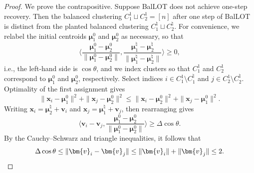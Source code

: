\documentclass{article}
\theoremstyle{plain}
\theoremstyle{definition}
\newcommand{\1}{\mathbf{1}}
\newcommand{\bmu}{\bm{\mu}}
\begin{document}
\begin{proof}
We prove the contrapositive.
Suppose BalLOT does not achieve one-step recovery. Then the balanced clustering $C_1^1\sqcup C_2^1 = [n]$ after one step of BalLOT is distinct from the planted balanced clustering $C_1^\natural \sqcup C_2^\natural$. For convenience, we relabel the initial centroids $\bmu_1^0$ and $\bmu_2^0$ as necessary, so that
\[
\bigg\langle
\frac{\bmu_1^0-\bmu_2^0}{\|\bmu_1^0-\bmu_2^0\|},
\frac{\bmu^{\natural}_1-\bmu^{\natural}_2}{\|\bmu^{\natural}_1-\bmu^{\natural}_2\|}
\bigg\rangle
\geq0,
\]
i.e., the left-hand side is $\cos\theta$, and we index clusters so that $C_1^1$ and $C_2^1$ correspond to $\bmu_1^0$ and $\bmu_2^0$, respectively. 
Select indices $i\in C_1^1\setminus C_1^\natural$ and $j\in C_2^1\setminus C_2^\natural$.
Optimality of the first assignment gives
\[
\|\bm{x}_i-\bmu_1^0\|^2+\|\bm{x}_j-\bmu_2^0\|^2
\leq
\|\bm{x}_i-\bmu_2^0\|^2+\|\bm{x}_j-\bmu_1^0\|^2.
\]
Writing $\bm{x}_i=\bmu^{\natural}_2+\bm{v}_i$ and $\bm{x}_j=\bmu^{\natural}_1+\bm{v}_j$, then rearranging gives
\[
\bigg\langle\bm{v}_i-\bm{v}_j,
\frac{\bmu_1^0-\bmu_2^0}{\|\bmu_1^0-\bmu_2^0\|}\bigg\rangle
\geq\Delta\cos\theta.
\]
By the Cauchy--Schwarz and triangle inequalities, it follows that
\[
\Delta\cos\theta
\leq\|\bm{v}_i-\bm{v}_j\|
\leq\|\bm{v}_i\|+\|\bm{v}_j\|
\leq2.
\qedhere
\]
\end{proof}
\end{document}
